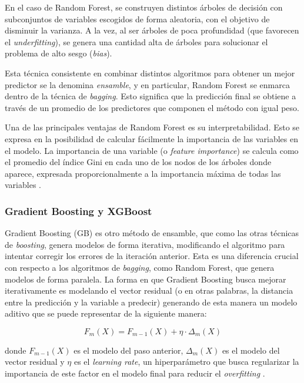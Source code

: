 En el caso de Random Forest, se construyen distintos árboles de decisión con subconjuntos de variables escogidos de forma aleatoria, con el objetivo de disminuir la varianza. A la vez, al ser árboles de poca profundidad (que favorecen el \textit{underfitting}), se genera una cantidad alta de árboles para solucionar el problema de alto sesgo (\textit{bias}). 

Esta técnica consistente en combinar distintos algoritmos para obtener un mejor predictor se la denomina \textit{ensamble}, y en particular, Random Forest se enmarca dentro de la técnica de \textit{bagging}. Esto significa que la predicción final se obtiene a través de un promedio de los predictores que componen el método con igual peso.

Una de las principales ventajas de Random Forest es su interpretabilidad. Esto se expresa en la posibilidad de calcular fácilmente la importancia de las variables en el modelo. La importancia de una variable (o \textit{feature importance}) se calcula como el promedio del índice Gini en cada uno de los nodos de los árboles donde aparece, expresada proporcionalmente a la importancia máxima de todas las variables \cite{Hastie2001}.

\subsubsection{Gradient Boosting y XGBoost}

Gradient Boosting (GB) es otro método de ensamble, que como las otras técnicas de \textit{boosting}, genera modelos de forma iterativa, modificando el algoritmo para intentar corregir los errores de la iteración anterior. Esta es una diferencia crucial con respecto a los algoritmos de \textit{bagging}, como Random Forest, que genera modelos de forma paralela. La forma en que Gradient Boosting busca mejorar iterativamente es modelando el vector residual (o en otras palabras, la distancia entre la predicción y la variable a predecir) generando de esta manera un modelo aditivo que se puede representar de la siguiente manera:

\begin{equation*}
    F_{m}(X) = F_{m - 1}(X) + \eta \cdot \Delta_{m}(X) 
\end{equation*}

donde $F_{m - 1}(X)$ es el modelo del paso anterior, $\Delta_{m}(X)$ es el modelo del vector residual y $\eta$ es el \textit{learning rate}, un hiperparámetro que busca regularizar la importancia de este factor en el modelo final para reducir el \textit{overfitting} \cite{gradient}. 

